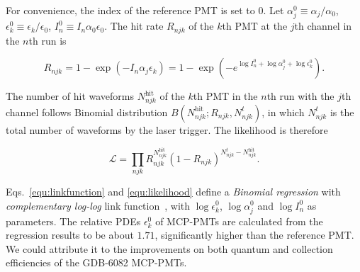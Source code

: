 For convenience, the index of the reference PMT is set to 0. Let $\alpha_j^0\equiv\alpha_j/{\alpha_0}$, $\epsilon_k^0\equiv\epsilon_k/{\epsilon_0}$, $I_n^0\equiv I_n\alpha_0\epsilon_0$.  The hit rate $R_{njk}$ of the $k$th PMT at the $j$th channel in the $n$th run is

\begin{equation}
    \label{equ:linkfunction}
    R_{njk}=1-\exp\left(-I_n\alpha_j\epsilon_k\right)=1-\exp\left(-e^{\log{I_n^0}+\log{\alpha_j^0}+\log{\epsilon_k^0}}\right).
\end{equation}

The number of hit waveforms $N^{\mathrm{hit}}_{njk}$ of the $k$th PMT in the $n$th run with the $j$th channel follows Binomial distribution $B(N^{\mathrm{hit}}_{njk};R_{njk},N^t_{njk})$, in which $N^t_{njk}$ is the total number of waveforms by the laser trigger. The likelihood is therefore

\begin{equation}
    \label{equ:likelihood}
    \mathcal{L}=\prod_{njk}{R_{njk}^{N^\mathrm{hit}_{njk}}(1-R_{njk})^{N^t_{njk}-N^{\mathrm{hit}}_{njk}}}.
\end{equation}

Eqs.~\eqref{equ:linkfunction} and \eqref{equ:likelihood} define a \emph{Binomial regression} with \emph{complementary log-log} link function~\cite{glm}, with $\log{\epsilon_k^0}$, $\log{\alpha_j^0}$ and $\log{I_n^0}$ as parameters. The relative PDEs $\epsilon_k^0$ of MCP-PMTs are calculated from the regression results to be about $1.71$, significantly higher than the reference PMT.  We could attribute it to the improvements on both quantum and collection efficiencies of the GDB-6082 MCP-PMTs.
